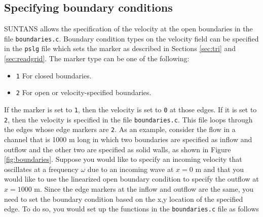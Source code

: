\subsection{Specifying boundary conditions} \label{sec:boundary}

SUNTANS allows the specification of the velocity at the open boundaries in the file
\verb+boundaries.c+.  Boundary condition types on the velocity field can be specified in the \verb+pslg+ file
which sets the marker as described in Sections \ref{sec:tri} and \ref{sec:readgrid}.  The marker type
can be one of the following:
\begin{itemize}
\item \verb+1+ For closed boundaries.
\item \verb+2+ For open or velocity-specified boundaries.
\end{itemize}
If the marker is set to \verb+1+, then the velocity is set to \verb+0+ at those edges.  If it is set to \verb+2+,
then the velocity is specified in the file \verb+boundaries.c+.  This file loops through the edges whose edge
markers are \verb+2+.  As an example, consider the flow in a channel that is 1000 m long in which two boundaries
are specified as inflow and outflow and the other two are specified as solid walls, as shown in Figure 
\ref{fig:boundaries}.  
Suppose you would like to
specify an incoming velocity that oscillates at a frequency $\omega$ due to an incoming wave at $x=0$ m and that
you would like to use the linearized open boundary condition to specify the outflow at $x=1000$ m.  Since the
edge markers at the inflow and outflow are the same, you need to set the boundary condition based on the x,y
location of the specified edge.  To do so, you would set up the functions in the \verb+boundaries.c+ file as follows
